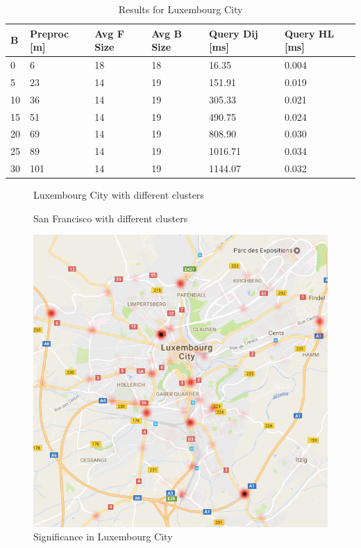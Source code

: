 \begin{table}\caption{Results for Luxembourg City}\label{tab:lu4k_results}
\begin{center}
\begin{tabular}{ | l | p{1cm} | p{1cm} | p{1cm} | p{1.2cm} | p{1.2cm} |}
\hline
	B & Preproc  [m] & Avg F Size & Avg B Size & Query Dij [ms] & Query HL [ms] \\ \hline \hline
	0 & 6 & 18 & 18 & 16.35 & 0.004 \\ \hline
	5 & 23 & 14& 19 & 151.91 & 0.019 \\ \hline
	10 & 36 & 14 & 19 & 305.33 & 0.021 \\ \hline
	15 & 51 & 14& 19 & 490.75 & 0.024 \\ \hline
	20 & 69 & 14 & 19 & 808.90 & 0.030 \\ \hline
	25 & 89 & 14 & 19 & 1016.71 & 0.034 \\ \hline
	30 & 101 & 14& 19 & 1144.07 & 0.032 \\ \hline
\end{tabular}
\end{center}
\end{table}

\begin{figure}\caption{Luxembourg City with different clusters}\label{fig:clusters_lu}
\hfill

\end{figure}

\begin{figure}\caption{San Francisco with different clusters}\label{fig:clusters_sf}
\hfill

\end{figure}


\begin{figure}\caption{Significance in Luxembourg City}\label{fig:map_LU} 
\begin{center}
\includegraphics[scale=0.37]{TexImg/map_LU_sig.png}
\end{center}
\end{figure}

